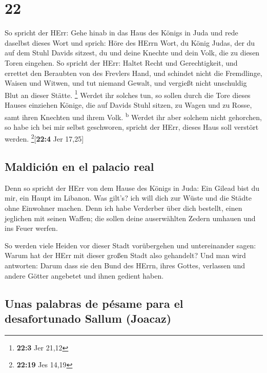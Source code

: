 \hypertarget{section-21}{%
\section{22}\label{section-21}}

 So spricht der HErr: Gehe hinab in das Haus des Königs in
Juda und rede daselbst dieses Wort  und sprich: Höre des
HErrn Wort, du König Judas, der du auf dem Stuhl Davids sitzest, du und
deine Knechte und dein Volk, die zu diesen Toren eingehen.
 So spricht der HErr: Haltet Recht und Gerechtigkeit, und
errettet den Beraubten von des Frevlers Hand, und schindet nicht die
Fremdlinge, Waisen und Witwen, und tut niemand Gewalt, und vergießt
nicht unschuldig Blut an dieser Stätte. \footnote{\textbf{22:3} Jer
  21,12}  Werdet ihr solches tun, so sollen durch die Tore
dieses Hauses einziehen Könige, die auf Davids Stuhl sitzen, zu Wagen
und zu Rosse, samt ihren Knechten und ihrem Volk. \textsuperscript{b}
 Werdet ihr aber solchem nicht gehorchen, so habe ich bei
mir selbst geschworen, spricht der HErr, dieses Haus soll verstört
werden. \footnote{\textbf{22:19} Jes 14,19}{[}\textbf{22:4} Jer 17,25{]}

\hypertarget{maldiciuxf3n-en-el-palacio-real}{%
\subsection{Maldición en el palacio
real}\label{maldiciuxf3n-en-el-palacio-real}}

 Denn so spricht der HErr von dem Hause des Königs in
Juda: Ein Gilead bist du mir, ein Haupt im Libanon. Was gilt's? ich will
dich zur Wüste und die Städte ohne Einwohner machen.  Denn
ich habe Verderber über dich bestellt, einen jeglichen mit seinen
Waffen; die sollen deine auserwählten Zedern umhauen und ins Feuer
werfen.

 So werden viele Heiden vor dieser Stadt vorübergehen und
untereinander sagen: Warum hat der HErr mit dieser großen Stadt also
gehandelt?  Und man wird antworten: Darum dass sie den
Bund des HErrn, ihres Gottes, verlassen und andere Götter angebetet und
ihnen gedient haben.

\hypertarget{unas-palabras-de-puxe9same-para-el-desafortunado-sallum-joacaz}{%
\subsection{Unas palabras de pésame para el desafortunado Sallum
(Joacaz)}\label{unas-palabras-de-puxe9same-para-el-desafortunado-sallum-joacaz}}

